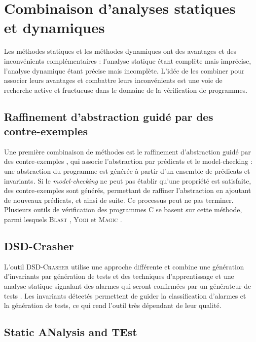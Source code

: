 \section{Combinaison d'analyses statiques et dynamiques}
\label{sec:combinaison}

Les méthodes statiques et les méthodes dynamiques ont des avantages et des
inconvénients complémentaires : l'analyse statique étant complète mais
imprécise, l'analyse dynamique étant précise mais incomplète. L’idée de les
combiner pour associer leurs avantages et combattre leurs inconvénients
\cite{duality} est une voie de recherche active et fructueuse dans le domaine de
la vérification de programmes.


\subsection{Raffinement d'abstraction guidé par des contre-exemples}

Une première combinaison de méthodes est le raffinement d'abstraction guidé par
des contre-exemples \cite{CEGAR}, qui associe l’abstraction par prédicats et le
model-checking : une abstraction du programme est générée à partir d’un ensemble
de prédicats et invariants. Si le {\em model-checking} ne peut pas établir
qu'une propriété est satisfaite, des contre-exemples sont générés, permettant de
raffiner l’abstraction en ajoutant de nouveaux prédicats, et ainsi de suite. Ce
processus peut ne pas terminer. Plusieurs outils de vérification des programmes
C se basent sur cette méthode, parmi lesquels \textsc{Blast} \cite{BLAST},
\textsc{Yogi} \cite{YOGI} et \textsc{Magic} \cite{MAGIC}.


\subsection{DSD-Crasher}

L'outil \textsc{DSD-Crasher} \cite{DSD-Crasher} utilise une approche différente
et combine une génération d'invariants par génération de tests et des techniques
d'apprentissage \cite{discover-invariants} et une analyse statique signalant des
alarmes qui seront confirmées par un générateur de tests \cite{JCrasher}. Les
invariants détectés permettent de guider la classification d'alarmes et la
génération de tests, ce qui rend l'outil très dépendant de leur qualité.


\subsection{Static ANalysis and TEst}


